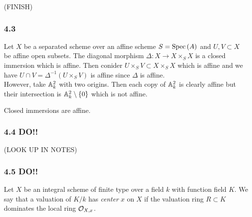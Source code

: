 \documentclass[12pt]{article}
\begin{document}
(FINISH)

\subsubsection{4.3}

Let $X$ be a separated scheme over an affine scheme $S = \mathrm{Spec}\left( A \right)$ and $U, V \subset X$ be affine open subsets. The diagonal morphism $\Delta : X \to X \times_S X$ is a closed immersion which is affine. Then conider $U \times_S V \subset X \times_S X$ which is affine and we have $U \cap V = \Delta^{-1}(U \times_S V)$ is affine since $\Delta$ is affine.
\bigskip\\
However, take $\mathbb{A}^2_k$ with two origins. Then each copy of $\mathbb{A}^2_k$ is clearly affine but their intersection is $\mathbb{A}^2_k \setminus \{ 0 \}$ which is not affine. 

\begin{lemma}
Closed immersions are affine.
\end{lemma}


\subsubsection{4.4 DO!!}

(LOOK UP IN NOTES)

\subsubsection{4.5 DO!!}

Let $X$ be an integral scheme of finite type over a field $k$ with function field $K$. We say that a valuation of $K / k$ has \textit{center} $x$ on $X$ if the valuation ring $R \subset K$ dominates the local ring $\mathcal{O}_{X, x}$.
\end{document}
